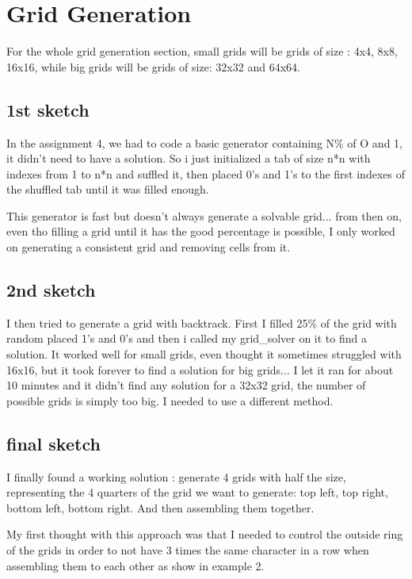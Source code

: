 \documentclass{article}
\begin{document}
\section{Grid Generation}

For the whole grid generation section, small grids will be grids of size : 4x4, 8x8, 16x16, while big grids will be grids of size: 32x32 and 64x64.

\subsection{1st sketch}

In the assignment 4, we had to code a basic generator containing N\% of O and 1, it didn't need to have a solution. So i just initialized a tab of size n*n with indexes from 1 to n*n and suffled it, then placed 0's and 1's to the first indexes of the shuffled tab until it was filled enough.

This generator is fast but doesn't always generate a solvable grid...
from then on, even tho filling a grid until it has the good percentage is possible, I only worked on generating a consistent grid and removing cells from it.

\subsection{2nd sketch}

I then tried to generate a grid with backtrack. First I filled 25\% of the grid with random placed 1's and 0's and then i called my grid\_solver on it to find a solution. It worked well for small grids, even thought it sometimes struggled with 16x16, but it took forever to find a solution for big grids...
I let it ran for about 10 minutes and it didn't find any solution for a 32x32 grid, the number of possible grids is simply too big. I needed to use a different method.

\subsection{final sketch}

I finally found a working solution : generate 4 grids with half the size, representing the 4 quarters of the grid we want to generate: top left, top right, bottom left, bottom right. And then assembling them together.

My first thought with this approach was that I needed to control the outside ring of the grids in order to not have 3 times the same character in a row when assembling them to each other as show in example 2.
\end{document}
